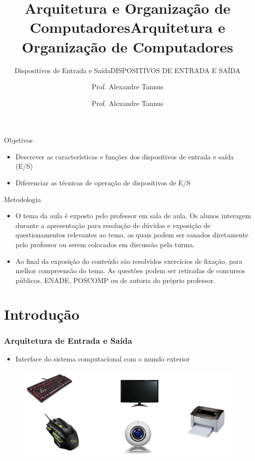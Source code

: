 \documentclass[aspectratio=169,
				xcolor=table]{beamer}
\title[]{Arquitetura e Organização de Computadores}
\subtitle[]{Dispositivos de Entrada e Saída}
\author[]{Prof. Alexandre Tannus}
\date{}
\institute[]{\uppercase{Engenharia de Software}}
\title[]{Arquitetura e Organização de Computadores}
\subtitle[]{\uppercase{Dispositivos de Entrada e Saída}}
\author[]{Prof. Alexandre Tannus}
\date{}
\begin{document}
	\begin{frame}
		\titlepage
	\end{frame}

	\begin{frame}{Objetivos}
		\begin{itemize}
			\item Descrever as características e funções dos dispositivos de entrada e saída (E/S)
			\vspace{1em}
			\item Diferenciar as técnicas de operação de dispositivos de E/S
		\end{itemize}
	\end{frame}

	\begin{frame}{Metodologia}
		\begin{itemize}
			\item O tema da aula é exposto pelo professor em sala de aula. Os alunos interagem durante a apresentação para resolução de dúvidas e exposição de questionamentos relevantes ao tema, os quais podem ser sanados diretamente pelo professor ou serem colocados em discussão pela turma. 
			\vspace{1em}
			\item Ao final da exposição do conteúdo são resolvidos exercícios de fixação, para melhor compreensão do tema. As questões podem ser retiradas de concursos públicos, ENADE, POSCOMP ou de autoria do próprio professor.
		\end{itemize}
	\end{frame}

	\begin{frame}
		\tableofcontents		
	\end{frame}	
	
	\section{Introdução}
	
	\begin{frame}
		\frametitle{Arquitetura de Entrada e Saída}
		\begin{itemize}
			\item Interface do sistema computacional com o mundo exterior
			
		\end{itemize}
		\begin{figure}[hbtp]
		\centering
		\includegraphics[height=.5\textheight, keepaspectratio]{../figs/cap10/dispositivos.png}
		\end{figure}		
	\end{frame}
\end{document}
